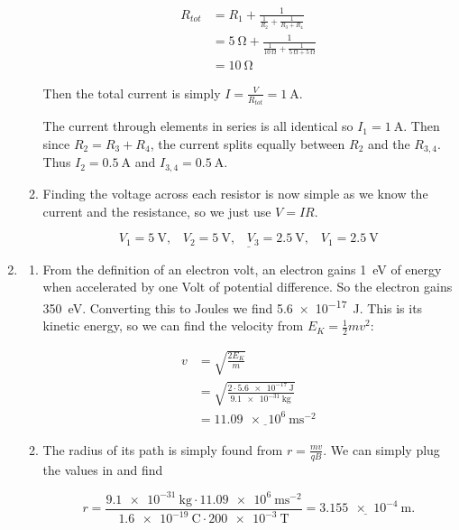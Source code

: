 \documentclass[11pt]{article}
\numberwithin{equation}{section}
\numberwithin{figure}{section}
\numberwithin{table}{section}
\begin{document}
\begin{enumerate}
\begin{enumerate}
        \begin{align*}
            R_{tot} &= R_1 + \frac{1}{\frac{1}{R_2} + \frac{1}{R_3 + R_4}} \\
            &= \SI{5}{\ohm} + \frac{1}{\frac{1}{\SI{10}{\ohm}} + \frac{1}{\SI{5}{\ohm} + \SI{5}{\ohm}}} \\
            &= \SI{10}{\ohm}
        \end{align*}

        Then the total current is simply $I = \frac{V}{R_{tot}} = \SI{1}{\ampere}$. 
        
        The current through elements in series is all identical so \underline{$I_1=\SI{1}{\ampere}$}. Then since $R_2=R_3+R_4$, the current splits equally between $R_2$ and the $R_{3,4}$. Thus \underline{$I_2=\SI{0.5}{\ampere}$} and \underline{$I_{3,4}=\SI{0.5}{\ampere}$}.

        \item Finding the voltage across each resistor is now simple as we know the current and the resistance, so we just use $V=IR$.
        
        \begin{equation*}
            \underline{V_1 = \SI{5}{\volt},\;\;\;V_2 = \SI{5}{\volt},\;\;\;V_3 = \SI{2.5}{\volt},\;\;\;V_1 = \SI{2.5}{\volt}}
        \end{equation*}
    \end{enumerate}

    \item \begin{enumerate}
        \item From the definition of an electron volt, an electron gains \SI{1}{\electronvolt} of energy when accelerated by one Volt of potential difference. So the electron gains \SI{350}{\electronvolt}. Converting this to Joules we find \SI{5.6e-17}{\joule}. This is its kinetic energy, so we can find the velocity from $E_K = \frac{1}{2}m v^2$:
        
        \begin{align*}
            v &= \sqrt{\frac{2E_K}{m}} \\
            &= \sqrt{\frac{2\cdot \SI{5.6e-17}{\joule}}{\SI{9.1e-31}{\kilo\gram}}} \\
            &= \underline{\SI{11.09e6}{\metre\second^{-2}}}
        \end{align*}

        \item The radius of its path is simply found from $r = \frac{mv}{qB}$. We can simply plug the values in and find
        
        \begin{equation}
            r=\frac{\SI{9.1e-31}{\kilo\gram}\cdot \SI{11.09e6}{\metre\second^{-2}}}{\SI{1.6e-19}{\coulomb}\cdot\SI{200e-3}{\tesla}}=\underline{\SI{3.155e-4}{\metre}}.
        \end{equation}
        
    \end{enumerate}
\end{enumerate}
\end{document}
